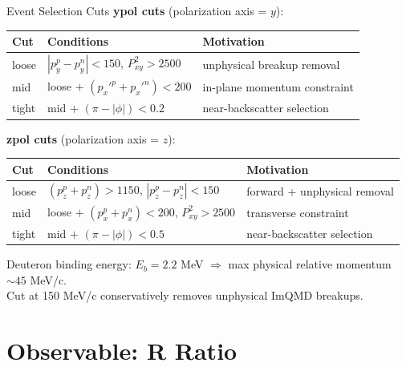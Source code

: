 \documentclass[aspectratio=169,11pt]{beamer}
\begin{document}
\begin{frame}{Event Selection Cuts}
\textbf{ypol cuts} (polarization axis = $y$):
\begin{table}[h]
\centering
\small
\begin{tabular}{lll}
\toprule
\textbf{Cut} & \textbf{Conditions} & \textbf{Motivation} \\
\midrule
loose & $|p_y^p - p_y^n| < 150$, $P_{xy}^2 > 2500$ & unphysical breakup removal \\
mid   & loose $+$ $(p_x'^p + p_x'^n) < 200$ & in-plane momentum constraint \\
tight & mid $+$ $(\pi - |\phi|) < 0.2$ & near-backscatter selection \\
\bottomrule
\end{tabular}
\end{table}

\vspace{0.2cm}
\textbf{zpol cuts} (polarization axis = $z$):
\begin{table}[h]
\centering
\small
\begin{tabular}{lll}
\toprule
\textbf{Cut} & \textbf{Conditions} & \textbf{Motivation} \\
\midrule
loose & $(p_z^p + p_z^n) > 1150$, $|p_z^p - p_z^n| < 150$ & forward + unphysical removal \\
mid   & loose $+$ $(p_x^p + p_x^n) < 200$, $P_{xy}^2 > 2500$ & transverse constraint \\
tight & mid $+$ $(\pi - |\phi|) < 0.5$ & near-backscatter selection \\
\bottomrule
\end{tabular}
\end{table}

\vspace{0.2cm}
\footnotesize
Deuteron binding energy: $E_b = 2.2$ MeV $\Rightarrow$ max physical relative momentum $\sim 45$ MeV/c. \\
Cut at 150 MeV/c conservatively removes unphysical ImQMD breakups.
\end{frame}

\section{Observable: R Ratio}
\end{document}

